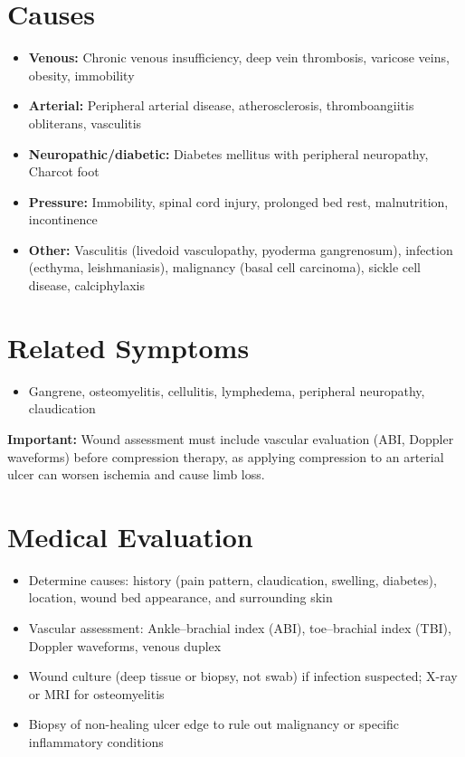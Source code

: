 \section*{Causes}
\begin{itemize}
  \item \textbf{Venous:} Chronic venous insufficiency, deep vein thrombosis, varicose veins, obesity, immobility
  \item \textbf{Arterial:} Peripheral arterial disease, atherosclerosis, thromboangiitis obliterans, vasculitis
  \item \textbf{Neuropathic/diabetic:} Diabetes mellitus with peripheral neuropathy, Charcot foot
  \item \textbf{Pressure:} Immobility, spinal cord injury, prolonged bed rest, malnutrition, incontinence
  \item \textbf{Other:} Vasculitis (livedoid vasculopathy, pyoderma gangrenosum), infection (ecthyma, leishmaniasis), malignancy (basal cell carcinoma), sickle cell disease, calciphylaxis
\end{itemize}

\section*{Related Symptoms}
\begin{itemize}
  \item Gangrene, osteomyelitis, cellulitis, lymphedema, peripheral neuropathy, claudication
\end{itemize}
\textbf{Important:} Wound assessment must include vascular evaluation (ABI, Doppler waveforms) before compression therapy, as applying compression to an arterial ulcer can worsen ischemia and cause limb loss.

\section*{Medical Evaluation}
\begin{itemize}
  \item Determine causes: history (pain pattern, claudication, swelling, diabetes), location, wound bed appearance, and surrounding skin
  \item Vascular assessment: Ankle--brachial index (ABI), toe--brachial index (TBI), Doppler waveforms, venous duplex
  \item Wound culture (deep tissue or biopsy, not swab) if infection suspected; X-ray or MRI for osteomyelitis
  \item Biopsy of non-healing ulcer edge to rule out malignancy or specific inflammatory conditions
\end{itemize}

